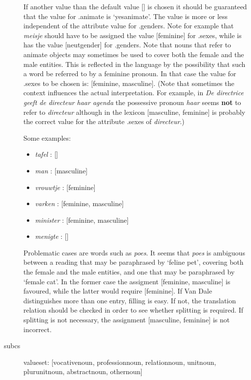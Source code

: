 \begin{description}
If another value than the default value [] is chosen it should be guaranteed
that the value for .animate is `yesanimate'.
The value is more or less independent of the attribute value for .genders.
Note for example that {\em meisje} should have to be assigned the value 
[feminine] for .sexes, while is has the value [neutgender] for .genders.
Note that nouns that refer to animate objects may sometimes be used to
cover both the female and the male entities. This is reflected in the
language by the possibility that such a word be referred to by
a feminine pronoun. In that case
the value for .sexes to be chosen is: [feminine, masculine]. (Note that
sometimes the context influences the actual interpretation. For example, in 
{\em De directrice geeft de directeur haar agenda} the possessive pronoun {\em 
haar} seems {\bf not} to refer to {\em directeur} although in the 
lexicon [masculine, feminine] is probably the correct value for the attribute 
.sexes of {\em directeur}.)

Some examples:
\begin{itemize}
  \item 
{\em tafel}    : []
  \item
{\em man}      : [masculine]
  \item
{\em vrouwtje} : [feminine]
  \item
{\em varken}   : [feminine, masculine]
  \item
{\em minister} : [feminine, masculine]
  \item
{\em menigte}  : []
\end{itemize}

Problematic cases are words such as {\em poes}. It seems 
that {\em poes}
is ambiguous 
between a reading that may be paraphrased by  `feline pet', covering
both the female and the male entities,  and one that
may be paraphrased by `female cat'.  In the former case the assigment 
[feminine, masculine] is favoured, while the latter would require [feminine].
If Van Dale distinguishes more than one  entry, filling is easy.
If not, the translation relation should be checked in order to see whether 
splitting is required. If splitting is not necessary, the assignment 
[masculine, feminine] is not incorrect.


\newpage
\item 
[subcs]\mbox{}

valueset: [vocativenoun, professionnoun, relationnoun, unitnoun,
            plurunitnoun, abstractnoun, othernoun]\\


\end{description}
